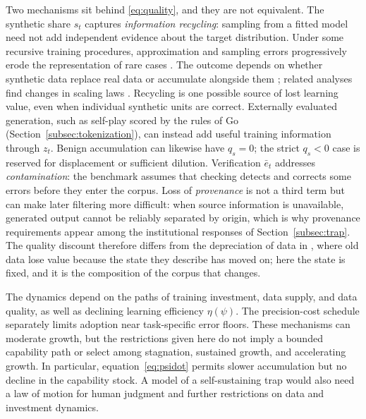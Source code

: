 \documentclass[12pt]{article}
\theoremstyle{plain}
\theoremstyle{definition}
\theoremstyle{remark}
\begin{document}
Two mechanisms sit behind \eqref{eq:quality}, and they are not
equivalent. The synthetic share $s_t$ captures \emph{information
recycling}: sampling from a fitted model need not add independent
evidence about the target distribution. Under some recursive training
procedures, approximation and sampling errors progressively erode the
representation of rare cases \citep{Shumailov2024}. The outcome depends
on whether synthetic data replace real data or accumulate alongside
them \citep{AlemohammadEtAl2024MAD, GerstgrasserEtAl2024Accumulate};
related analyses find changes in scaling laws
\citep{DohmatobEtAl2024Tails}.
Recycling is one possible source of lost learning value, even when
individual synthetic units are correct. Externally evaluated generation,
such as self-play scored by the rules of Go
(Section~\ref{subsec:tokenization}), can instead add useful training
information through $z_t$. Benign accumulation can likewise
have $q_s=0$; the strict $q_s<0$ case is reserved for displacement or
sufficient dilution. Verification $\bar{e}_t$ addresses \emph{contamination}: the benchmark
assumes that checking detects and corrects some errors before they
enter the corpus. Loss of
\emph{provenance} is not a third term but can make later filtering more
difficult: when source information is unavailable, generated output
cannot be reliably separated by origin, which is why provenance
requirements appear among the institutional responses of
Section~\ref{subsec:trap}. The quality discount therefore differs from
the depreciation of data in \citet{FarboodiVeldkamp2021DataEconomy},
where old data lose value because the state they describe has moved on;
here the state is fixed, and it is the composition of the corpus that
changes.

The dynamics depend on the paths of training investment, data supply,
and data quality, as well as declining learning efficiency
$\eta(\psi)$. The precision-cost
schedule separately limits adoption near task-specific error floors.
These mechanisms can moderate growth, but the restrictions given here
do not imply a bounded capability path or select among stagnation,
sustained growth, and accelerating growth. In particular,
equation~\eqref{eq:psidot} permits slower accumulation but no decline in
the capability stock. A model of a self-sustaining trap would also need
a law of motion for human judgment and further restrictions on data and
investment dynamics.
\end{document}
